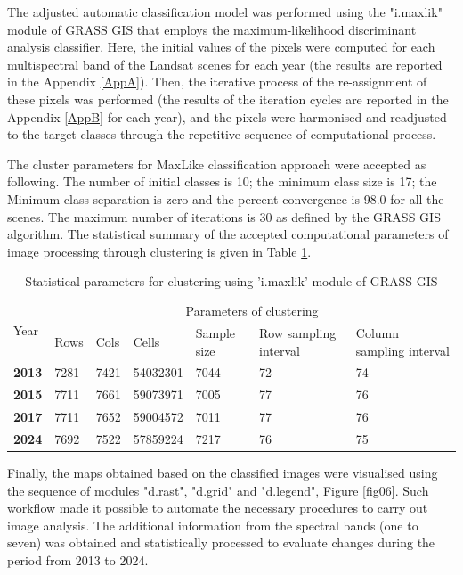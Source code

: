 \documentclass[jmse,article,submit,pdftex,moreauthors]{Definitions/mdpi}
\begin{document}
The adjusted automatic classification model was performed using the "i.maxlik" module of GRASS GIS that employs the maximum-likelihood discriminant analysis classifier. Here, the initial values of the pixels were computed for each multispectral band of the Landsat scenes for each year (the results are reported in the Appendix \ref{AppA}). Then, the iterative process of the re-assignment of these pixels was performed (the results of the iteration cycles are reported in the Appendix \ref{AppB} for each year), and the pixels were harmonised and readjusted to the target classes through the repetitive sequence of computational process. 

The cluster parameters for MaxLike classification approach were accepted as following. The number of initial classes is 10; the minimum class size is 17; the Minimum class separation is zero and the percent convergence is 98.0 for all the scenes. The maximum number of iterations is 30 as defined by the GRASS GIS algorithm. The statistical summary of the accepted computational parameters of image processing through clustering is given in Table \ref{tab02}.

\begin{table}[H]
  \centering
  \begin{tabularx}{\textwidth}{p{0.9cm}p{0.9cm}p{0.9cm}p{1.0cm}p{2.0cm}p{2.2cm}p{2.5cm}}
  \toprule
  \multirow{2}{*}{Year} & \multicolumn{6}{c}{Parameters of clustering} \\
     & Rows & Cols & Cells & Sample size & Row sampling interval & Column sampling interval \\
    \midrule
    \textbf{2013} & 7281 & 7421 & 54032301 & 7044 & 72 & 74 \\
    \textbf{2015} & 7711 & 7661 & 59073971 & 7005 & 77 & 76 \\
    \textbf{2017} & 7711 & 7652 & 59004572 & 7011 & 77 & 76 \\
    \textbf{2024} & 7692 & 7522 & 57859224 & 7217 & 76 & 75 \\
\bottomrule
\end{tabularx}
  \caption{Statistical parameters for clustering using 'i.maxlik' module of GRASS GIS}
  \label{tab02}
\end{table}

Finally, the maps obtained based on the classified images were visualised using the sequence of modules "d.rast", "d.grid" and "d.legend", Figure \ref{fig06}.  Such workflow made it possible to automate the necessary procedures to carry out image analysis. The additional information from the spectral bands (one to seven)  was obtained and statistically processed to evaluate changes during the period from 2013 to 2024. 
\end{document}
